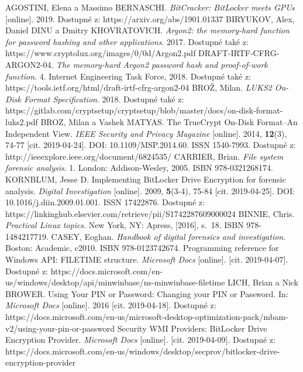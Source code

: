 \documentclass[a4paper,12pt]{article}
\begin{document}
{
AGOSTINI, Elena a Massimo BERNASCHI. \textit{BitCracker: BitLocker meets GPUs} [online]. 2019. Dostupné z: https://arxiv.org/abs/1901.01337
BIRYUKOV, Alex, Daniel DINU a Dmitry KHOVRATOVICH. \textit{Argon2: the memory-hard function for password hashing and other applications}. 2017. Dostupné také z: https://www.cryptolux.org/images/0/0d/Argon2.pdf
DRAFT-IRTF-CFRG-ARGON2-04. \textit{The memory-hard Argon2 password hash and proof-of-work function}. 4. Internet Engineering Task Force, 2018. Dostupné také z: https://tools.ietf.org/html/draft-irtf-cfrg-argon2-04
BROŽ, Milan. \textit{LUKS2 On-Disk Format Specification}. 2018. Dostupné také z: https://gitlab.com/cryptsetup/cryptsetup/blob/master/docs/on-disk-format-luks2.pdf
BROZ, Milan a Vashek MATYAS. The TrueCrypt On-Disk Format--An Independent View. \textit{IEEE Security and Privacy Magazine} [online]. 2014, \textbf{12}(3), 74-77 [cit. 2019-04-24]. DOI: 10.1109/MSP.2014.60. ISSN 1540-7993. Dostupné z: http://ieeexplore.ieee.org/document/6824535/
CARRIER, Brian. \textit{File system forensic analysis}. 1. London: Addison-Wesley, 2005. ISBN 978-0321268174.
KORNBLUM, Jesse D. Implementing BitLocker Drive Encryption for forensic analysis. \textit{Digital Investigation} [online]. 2009, \textbf{5}(3-4), 75-84 [cit. 2019-04-25]. DOI: 10.1016/j.diin.2009.01.001. ISSN 17422876. Dostupné z: https://linkinghub.elsevier.com/retrieve/pii/S1742287609000024
BINNIE, Chris. \textit{Practical Linux topics}. New York, NY: Apress, [2016], s.~18. ISBN 978-1484217719.
CASEY, Eoghan. \textit{Handbook of digital forensics and investigation}. Boston: Academic, c2010. ISBN 978-0123742674.
Programming reference for Windows API: FILETIME structure. \textit{Microsoft Docs} [online]. [cit. 2019-04-07]. Dostupné z: https://docs.microsoft.com/en-us/windows/desktop/api/minwinbase/ns-minwinbase-filetime
LICH, Brian a Nick BROWER. Using Your PIN or Password: Changing your PIN or Password. In: \textit{Microsoft Docs} [online]. 2016 [cit. 2019-04-18]. Dostupné z: https://docs.microsoft.com/en-us/microsoft-desktop-optimization-pack/mbam-v2/using-your-pin-or-password
Security WMI Providers: BitLocker Drive Encryption Provider. \textit{Microsoft Docs} [online]. [cit. 2019-04-09]. Dostupné z: https://docs.microsoft.com/en-us/windows/desktop/secprov/bitlocker-drive-encryption-provider
}
\end{document}
